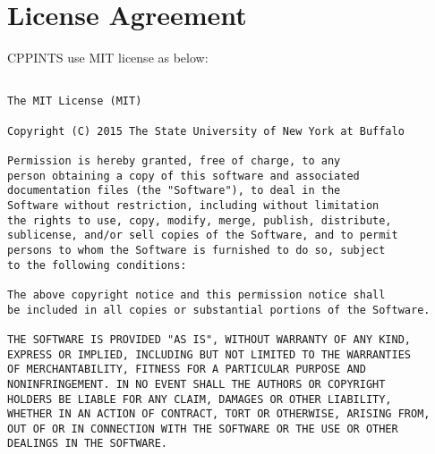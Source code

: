 \section{License Agreement}

CPPINTS use MIT license as below:

\newpage

\begin{verbatim}
 
The MIT License (MIT)

Copyright (C) 2015 The State University of New York at Buffalo

Permission is hereby granted, free of charge, to any 
person obtaining a copy of this software and associated 
documentation files (the "Software"), to deal in the 
Software without restriction, including without limitation 
the rights to use, copy, modify, merge, publish, distribute, 
sublicense, and/or sell copies of the Software, and to permit 
persons to whom the Software is furnished to do so, subject 
to the following conditions:

The above copyright notice and this permission notice shall 
be included in all copies or substantial portions of the Software.

THE SOFTWARE IS PROVIDED "AS IS", WITHOUT WARRANTY OF ANY KIND, 
EXPRESS OR IMPLIED, INCLUDING BUT NOT LIMITED TO THE WARRANTIES 
OF MERCHANTABILITY, FITNESS FOR A PARTICULAR PURPOSE AND 
NONINFRINGEMENT. IN NO EVENT SHALL THE AUTHORS OR COPYRIGHT 
HOLDERS BE LIABLE FOR ANY CLAIM, DAMAGES OR OTHER LIABILITY, 
WHETHER IN AN ACTION OF CONTRACT, TORT OR OTHERWISE, ARISING FROM,
OUT OF OR IN CONNECTION WITH THE SOFTWARE OR THE USE OR OTHER 
DEALINGS IN THE SOFTWARE.
\end{verbatim}